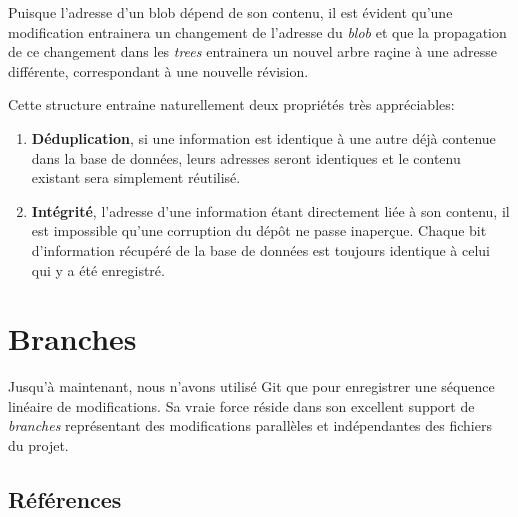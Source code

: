 \documentclass[11pt,a4paper]{article}
\begin{document}
Puisque l'adresse d'un blob dépend de son contenu, il est évident qu'une modification entrainera un changement de l'adresse du \textit{blob} et que la propagation de ce changement dans les \textit{trees} entrainera un nouvel arbre raçine à une adresse différente, correspondant à une nouvelle révision.

Cette structure entraine naturellement deux propriétés très appréciables:

\begin{enumerate}
	\item \textbf{Déduplication}, 
	si une information est identique à une autre déjà contenue dans la base de données, leurs adresses seront identiques et le contenu existant sera simplement réutilisé.
	
	\item \textbf{Intégrité},
	l'adresse d'une information étant directement liée à son contenu, il est impossible qu'une corruption du dépôt ne passe inaperçue.
	Chaque bit d'information récupéré de la base de données est toujours identique à celui qui y a été enregistré.
\end{enumerate}

\section{Branches}

Jusqu'à maintenant, nous n'avons utilisé Git que pour enregistrer une séquence linéaire de modifications. Sa vraie force réside dans son excellent support de \textit{branches} représentant des modifications parallèles et indépendantes des fichiers du projet.

\subsection{Références}
\end{document}
